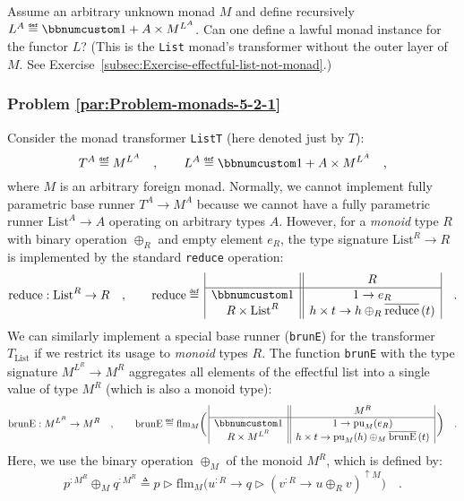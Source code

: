 Assume an arbitrary unknown monad $M$ and define recursively $L^{A}\triangleq\bbnum 1+A\times M^{L^{A}}$.
Can one define a lawful monad instance for the functor $L$? (This
is the \lstinline!List! monad\textsf{'}s transformer without the outer layer
of $M$. See Exercise~\ref{subsec:Exercise-effectful-list-not-monad}.)

\subsubsection{Problem \label{par:Problem-monads-5-2-1}\ref{par:Problem-monads-5-2-1}}

Consider the monad transformer \lstinline!ListT! (here denoted just
by $T$): 
\[
T^{A}\triangleq M^{L^{A}}\quad,\quad\quad L^{A}\triangleq\bbnum 1+A\times M^{L^{A}}\quad,
\]
where $M$ is an arbitrary foreign monad. Normally, we cannot implement
fully parametric base runner $T^{A}\rightarrow M^{A}$ because we
cannot have a fully parametric runner $\text{List}^{A}\rightarrow A$
operating on arbitrary types $A$. However, for a \emph{monoid} type
$R$ with binary operation $\oplus_{R}$ and empty element $e_{R}$,
the type signature $\text{List}^{R}\rightarrow R$ is implemented
by the standard \lstinline!reduce! operation: 
\[
\text{reduce}:\text{List}^{R}\rightarrow R\quad,\quad\quad\text{reduce}\triangleq\,\begin{array}{|c||c|}
 & R\\
\hline \bbnum 1 & 1\rightarrow e_{R}\\
R\times\text{List}^{R} & h\times t\rightarrow h\oplus_{R}\overline{\text{reduce}}\,(t)
\end{array}\quad.
\]
We can similarly implement a special base runner (\lstinline!brunE!)
for the transformer $T_{\text{List}}$ if we restrict its usage to
\emph{monoid} types $R$. The function \lstinline!brunE! with the
type signature $M^{L^{R}}\rightarrow M^{R}$ aggregates all elements
of the effectful list into a single value of type $M^{R}$ (which
is also a monoid type):
\[
\text{brunE}:M^{L^{R}}\rightarrow M^{R}\quad,\quad\quad\text{brunE}\triangleq\text{flm}_{M}\bigg(\,\begin{array}{|c||c|}
 & M^{R}\\
\hline \bbnum 1 & 1\rightarrow\text{pu}_{M}(e_{R})\\
R\times M^{L^{R}} & h\times t\rightarrow\text{pu}_{M}(h)\oplus_{M}\overline{\text{brunE}}\,(t)
\end{array}\,\bigg)\quad.
\]
Here, we use the binary operation $\oplus_{M}$ of the monoid $M^{R}$,
which is defined by:
\[
p^{:M^{R}}\oplus_{M}q^{:M^{R}}\triangleq p\triangleright\text{flm}_{M}\big(u^{:R}\rightarrow q\triangleright(v^{:R}\rightarrow u\oplus_{R}v)^{\uparrow M}\big)\quad.
\]

